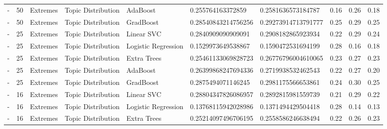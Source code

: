 \begin{table}[]
\begin{tabular}{@{}llllllllll@{}}
    -                   & 50              & Extremes              & Topic Distribution    & AdaBoost            & 0.255764163372859       & 0.2581636573184787     & 0.16               & 0.26            & 0.18              \\
    -                   & 50              & Extremes              & Topic Distribution    & GradBoost           & 0.28540843214756256     & 0.29273914713791777    & 0.25               & 0.29            & 0.25              \\
    -                   & 25              & Extremes              & Topic Distribution    & Linear SVC          & 0.2840909090909091      & 0.2908182865923934     & 0.22               & 0.29            & 0.24              \\
    -                   & 25              & Extremes              & Topic Distribution    & Logistic Regression & 0.1529973649538867      & 0.1590472531694199     & 0.28               & 0.16            & 0.18              \\
    -                   & 25              & Extremes              & Topic Distribution    & Extra Trees         & 0.25461133069828723     & 0.26776796004610065    & 0.23               & 0.27            & 0.23              \\
    -                   & 25              & Extremes              & Topic Distribution    & AdaBoost            & 0.26399868247694336     & 0.2719938532462543     & 0.22               & 0.27            & 0.20              \\
    -                   & 25              & Extremes              & Topic Distribution    & GradBoost           & 0.2875494071146245      & 0.2981175566653861     & 0.24               & 0.30            & 0.25              \\
    -                   & 16              & Extremes              & Topic Distribution    & Linear SVC          & 0.28804347826086957     & 0.2892815981559739     & 0.21               & 0.29            & 0.22              \\
    -                   & 16              & Extremes              & Topic Distribution    & Logistic Regression & 0.13768115942028986     & 0.1371494429504418     & 0.28               & 0.14            & 0.13              \\
    -                   & 16              & Extremes              & Topic Distribution    & Extra Trees         & 0.25214097496706195     & 0.2558586246638494     & 0.22               & 0.26            & 0.23              \\

\end{tabular}
\end{table}
